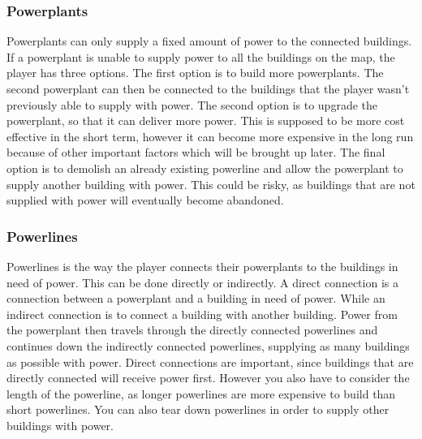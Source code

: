 \subsubsection*{Powerplants}
Powerplants can only supply a fixed amount of power to the connected buildings. If a powerplant is 
unable to supply power to all the buildings on the map, the player has three options. The first option 
is to build more powerplants. The second powerplant can then be connected to the buildings that the
player wasn't previously able to supply with power. The second option is to upgrade the powerplant,
so that it can deliver more power. This is supposed to be more cost effective in the short term, however
it can become more expensive in the long run because of other important factors which will be brought
up later. The final option is to demolish an already existing powerline and allow the powerplant to
supply another building with power. This could be risky, as buildings that are not supplied with power
will eventually become abandoned.

\subsubsection*{Powerlines}
Powerlines is the way the player connects their powerplants to the buildings in need of power. This 
can be done directly or indirectly. A direct connection is a connection between a powerplant and a 
building in need of power. While an indirect connection is to connect a building with another building.
Power from the powerplant then travels through the directly connected powerlines and continues down 
the indirectly connected powerlines, supplying as many buildings as possible with power. Direct 
connections are important, since buildings that are directly connected will receive power first.
However you also have to consider the length of the powerline, as longer powerlines are more expensive
to build than short powerlines. You can also tear down powerlines in order to supply other buildings
with power.

